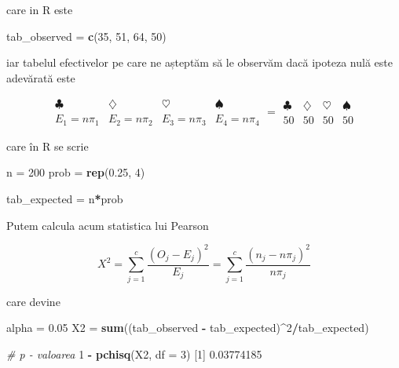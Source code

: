 \documentclass[]{article}
\newenvironment{Shaded}{\begin{snugshade}}{\end{snugshade}}
\newcommand{\KeywordTok}[1]{\textcolor[rgb]{0.13,0.29,0.53}{\textbf{#1}}}
\newcommand{\DataTypeTok}[1]{\textcolor[rgb]{0.13,0.29,0.53}{#1}}
\newcommand{\DecValTok}[1]{\textcolor[rgb]{0.00,0.00,0.81}{#1}}
\newcommand{\FloatTok}[1]{\textcolor[rgb]{0.00,0.00,0.81}{#1}}
\newcommand{\StringTok}[1]{\textcolor[rgb]{0.31,0.60,0.02}{#1}}
\newcommand{\CommentTok}[1]{\textcolor[rgb]{0.56,0.35,0.01}{\textit{#1}}}
\newcommand{\OperatorTok}[1]{\textcolor[rgb]{0.81,0.36,0.00}{\textbf{#1}}}
\newcommand{\NormalTok}[1]{#1}
\begin{document}
care in R este

\begin{Shaded}
\begin{Highlighting}[]
\NormalTok{tab_observed =}\StringTok{ }\KeywordTok{c}\NormalTok{(}\DecValTok{35}\NormalTok{, }\DecValTok{51}\NormalTok{, }\DecValTok{64}\NormalTok{, }\DecValTok{50}\NormalTok{)}
\end{Highlighting}
\end{Shaded}

iar tabelul efectivelor pe care ne așteptăm să le observăm dacă ipoteza
nulă este adevărată este

\[
\begin{array}{c|c|c|c}
  \clubsuit & \diamondsuit & \heartsuit & \spadesuit \\
  \hline
  E_1 = n\pi_1 & E_2 = n\pi_2 & E_3 = n\pi_3 & E_4 = n\pi_4
\end{array} 
=
\begin{array}{c|c|c|c}
  \clubsuit & \diamondsuit & \heartsuit & \spadesuit \\
  \hline
  50 & 50 & 50 & 50
\end{array}
\]

care în R se scrie

\begin{Shaded}
\begin{Highlighting}[]
\NormalTok{n =}\StringTok{ }\DecValTok{200}
\NormalTok{prob =}\StringTok{ }\KeywordTok{rep}\NormalTok{(}\FloatTok{0.25}\NormalTok{, }\DecValTok{4}\NormalTok{)}

\NormalTok{tab_expected =}\StringTok{ }\NormalTok{n}\OperatorTok{*}\NormalTok{prob}
\end{Highlighting}
\end{Shaded}

Putem calcula acum statistica lui Pearson

\[
  X^2 = \sum_{j = 1}^{c}\frac{(O_{j} - E_{j})^2}{E_{j}} = \sum_{j = 1}^{c}\frac{\left(n_{j} - n \pi_j\right)^2}{n \pi_j}
\]

care devine

\begin{Shaded}
\begin{Highlighting}[]
\NormalTok{alpha =}\StringTok{ }\FloatTok{0.05}
\NormalTok{X2 =}\StringTok{ }\KeywordTok{sum}\NormalTok{((tab_observed }\OperatorTok{-}\StringTok{ }\NormalTok{tab_expected)}\OperatorTok{^}\DecValTok{2}\OperatorTok{/}\NormalTok{tab_expected)}

\CommentTok{# p - valoarea}
\DecValTok{1} \OperatorTok{-}\StringTok{ }\KeywordTok{pchisq}\NormalTok{(X2, }\DataTypeTok{df =} \DecValTok{3}\NormalTok{)}
\NormalTok{[}\DecValTok{1}\NormalTok{] }\FloatTok{0.03774185}
\end{Highlighting}
\end{Shaded}
\end{document}
